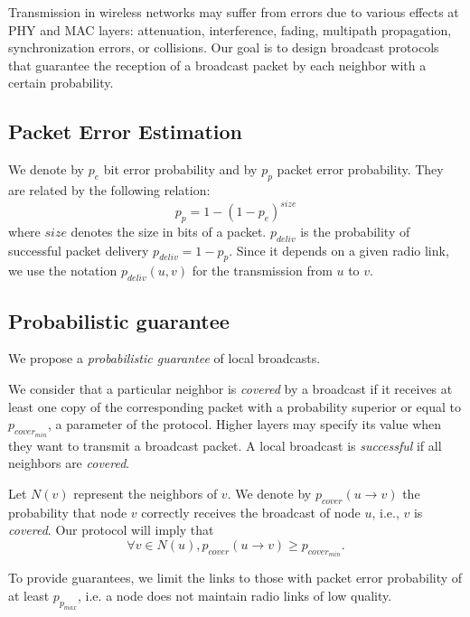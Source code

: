 \documentclass[twoside]{article}
\begin{document}
Transmission in wireless networks may suffer from errors due to various effects
at PHY and MAC layers: attenuation, interference, fading, multipath propagation,
synchronization errors, or collisions. Our goal is to design broadcast protocols
that guarantee the reception of a broadcast packet by each neighbor with a
certain probability.

\subsection{Packet Error Estimation}


We denote by $p_e$ bit error probability and by $p_p$ packet error probability.
They are related by the following relation:
\begin{equation}
p_{p} = 1 - (1-p_e)^{size}
\end{equation}
where $size$ denotes the size in bits of a packet. $p_{deliv}$ is the
probability of successful packet delivery $p_{deliv} = 1 - p_p $.
Since it depends on a given radio link, we use the notation $p_{deliv}(u,v)$ for
the transmission from $u$ to $v$. 

\subsection{Probabilistic guarantee}

We propose a \textit{probabilistic guarantee} of local broadcasts. 

We consider that a particular neighbor is \emph{covered} by a broadcast if it
receives at least one copy of the corresponding packet with a probability
superior or equal to $p_{cover_{min}}$, a
parameter of the protocol.
Higher layers may specify its value when they want to transmit a broadcast
packet.
A local broadcast is \emph{successful} if all neighbors are \emph{covered}. 

Let $N(v)$ represent the neighbors of $v$.
We denote by $p_{cover}(u \rightarrow v)$ the probability that node $v$ correctly
receives the broadcast of node $u$, i.e., $v$ is \emph{covered}.
Our protocol will imply that
\begin{equation}
	\forall  v \in N(u), p_{cover}(u \rightarrow v) \geq p_{cover_{min}}.
	\label{eq:broadcast_successful}
\end{equation}


To provide guarantees, we limit the links to those with packet error
probability of at least $p_{p_{max}}$, i.e. a node does not maintain radio
links of low quality. 
\end{document}
